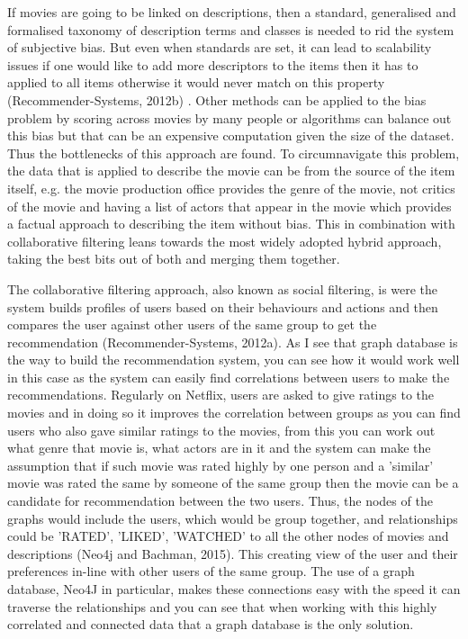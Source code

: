\documentclass[a4paper]{article}
\begin{document}
If movies are going to be linked on descriptions, then a standard, generalised and formalised taxonomy of description terms and classes is needed to rid the system of subjective bias. But even when standards are set, it can lead to scalability issues if one would like to add more descriptors to the items then it has to applied to all items otherwise it would never match on this property (Recommender-Systems, 2012b) . Other methods can be applied to the bias problem by scoring across movies by many people or algorithms can balance out this bias but that can be an expensive computation given the size of the dataset. Thus the bottlenecks of this approach are found. To circumnavigate this problem, the data that is applied to describe the movie can be from the source of the item itself, e.g. the movie production office provides the genre of the movie, not critics of the movie and having a list of actors that appear in the movie which provides a factual approach to describing the item without bias. This in combination with collaborative filtering leans towards the most widely adopted hybrid approach, taking the best bits out of both and merging them together.

The collaborative filtering approach, also known as social filtering, is were the system builds profiles of users based on their behaviours and actions and then compares the user against other users of the same group to get the recommendation (Recommender-Systems, 2012a). As I see that graph database is the way to build the recommendation system, you can see how it would work well in this case as the system can easily find correlations between users to make the recommendations. Regularly on Netflix, users are asked to give ratings to the movies and in doing so it improves the correlation between groups as you can find users who also gave similar ratings to the movies, from this you can work out what genre that movie is, what actors are in it and the system can make the assumption that if such movie was rated highly by one person and a 'similar' movie was rated the same by someone of the same group then the movie can be a candidate for recommendation between the two users. Thus, the nodes of the graphs would include the users, which would be group together, and relationships could be 'RATED', 'LIKED', 'WATCHED' to all the other nodes of movies and descriptions (Neo4j and Bachman, 2015). This creating view of the user and their preferences in-line with other users of the same group. The use of a graph database, Neo4J in particular, makes these connections easy with the speed it can traverse the relationships and you can see that when working with this highly correlated and connected data that a graph database is the only solution.
\end{document}
